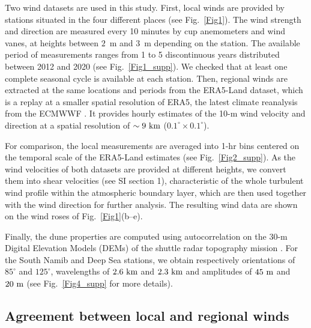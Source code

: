   Two wind datasets are used in this study. First, local winds are provided by stations situated in the four different places (see Fig.~\ref{Fig1}). The wind strength and direction are measured every 10 minutes by cup anemometers and wind vanes, at heights between $2$~m and $3$~m depending on the station. The available period of measurements ranges from 1 to 5 discontinuous years distributed between 2012 and 2020 (see Fig.~\ref{Fig1_supp}). We checked that at least one complete seasonal cycle is available at each station.
  Then, regional winds are extracted at the same locations and periods from the ERA5-Land dataset, which is a replay at a smaller spatial resolution of ERA5, the latest climate reanalysis from the ECMWWF \citep{Hersbach2020, munoz2021}. It provides hourly estimates of the 10-m wind velocity and direction at a spatial resolution of $\sim 9~\textup{km}$ ($0.1^\circ\times0.1^\circ$).

  For comparison, the local measurements are averaged into 1-hr bins centered on the temporal scale of the ERA5-Land estimates (see Fig.~\ref{Fig2_supp}). As the wind velocities of both datasets are provided at different heights, we convert them into shear velocities (see SI section 1), characteristic of the whole turbulent wind profile within the atmospheric boundary layer, which are then used together with the wind direction for further analysis. The resulting wind data are shown on the wind roses of Fig.~\ref{Fig1}(b--e).

  Finally, the dune properties are computed using autocorrelation on the 30-m Digital Elevation Models (DEMs) of the shuttle radar topography mission \citep{Farr2007}. For the South Namib and Deep Sea stations, we obtain respectively orientations of $85^\circ$ and $125^\circ$, wavelengths of $2.6~\textup{km}$ and $2.3~\textup{km}$ and amplitudes of $45~\textup{m}$ and $20~\textup{m}$ (see Fig.~\ref{Fig4_supp} for more details).

  \subsection{Agreement between local and regional winds}

